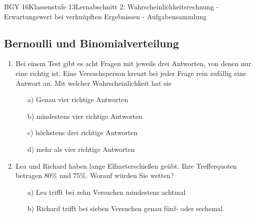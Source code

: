 \documentclass[oneside,openany,headings=optiontotoc,11pt,numbers=noenddot]{scrreprt}
\begin{document}
\begin{worksheet}{BGY 16}{Klassenstufe 13}{Lernabschnitt 2: Wahrscheinlichkeitsrechnung - Erwartungswert bei verknüpften Ergebnissen - Aufgabensammlung}
\begin{framed}
			\section*{Bernoulli und Binomialverteilung}
			\begin{enumerate}
				\item Bei einem Test gibt es acht Fragen mit jeweils drei Antworten, von denen nur eine richtig ist. Eine Versuchsperson kreuzt bei jeder Frage rein zufällig eine Antwort an. Mit welcher Wahrscheinlichkeit hat sie
				\begin{itemize}
					\item[a)] Genau vier richtige Antworten
					\item[b)] mindestens vier richtige Antworten
					\item[c)] höchstens drei richtige Antworten
					\item[d)] mehr als vier richtige Antworten
				\end{itemize}
				\item Lea und Richard haben lange Elfmeterschießen geübt. Ihre Trefferquoten betragen 80\% und 75\%. Worauf würden Sie wetten?
				\begin{itemize}
					\item[a)] Lea trifft bei zehn Versuchen mindestens achtmal
					\item[b)] Richard trifft bei sieben Versuchen genau fünf- oder sechsmal.
				\end{itemize}
			\end{enumerate}
		\end{framed}
	\end{worksheet}
\end{document}

